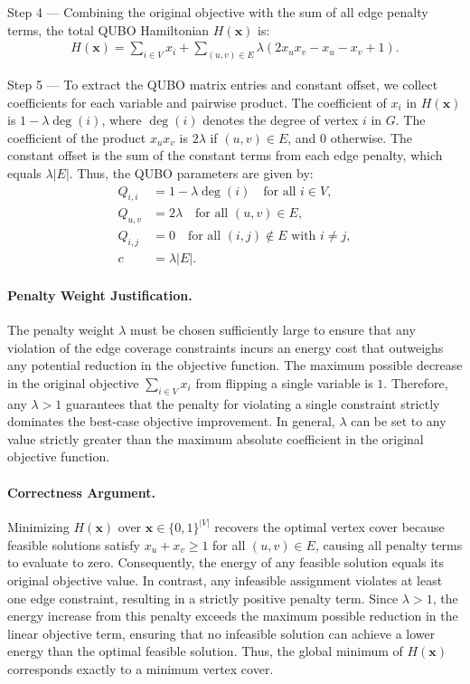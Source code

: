 \documentclass[12pt]{article}
\begin{document}
Step 4 --- Combining the original objective with the sum of all edge penalty terms, the total QUBO Hamiltonian $H(\mathbf{x})$ is:
\begin{align}
H(\mathbf{x}) = \sum_{i \in V} x_i + \sum_{(u, v) \in E} \lambda (2x_u x_v - x_u - x_v + 1).
\end{align}

Step 5 --- To extract the QUBO matrix entries and constant offset, we collect coefficients for each variable and pairwise product. The coefficient of $x_i$ in $H(\mathbf{x})$ is $1 - \lambda \deg(i)$, where $\deg(i)$ denotes the degree of vertex $i$ in $G$. The coefficient of the product $x_u x_v$ is $2\lambda$ if $(u, v) \in E$, and $0$ otherwise. The constant offset is the sum of the constant terms from each edge penalty, which equals $\lambda |E|$. Thus, the QUBO parameters are given by:
\begin{align}
Q_{i,i} &= 1 - \lambda \deg(i) \quad \text{for all } i \in V, \\
Q_{u,v} &= 2\lambda \quad \text{for all } (u, v) \in E, \\
Q_{i,j} &= 0 \quad \text{for all } (i, j) \notin E \text{ with } i \neq j, \\
c &= \lambda |E|.
\end{align}

\paragraph{Penalty Weight Justification.}
The penalty weight $\lambda$ must be chosen sufficiently large to ensure that any violation of the edge coverage constraints incurs an energy cost that outweighs any potential reduction in the objective function. The maximum possible decrease in the original objective $\sum_{i \in V} x_i$ from flipping a single variable is $1$. Therefore, any $\lambda > 1$ guarantees that the penalty for violating a single constraint strictly dominates the best-case objective improvement. In general, $\lambda$ can be set to any value strictly greater than the maximum absolute coefficient in the original objective function.

\paragraph{Correctness Argument.}
Minimizing $H(\mathbf{x})$ over $\mathbf{x} \in \{0, 1\}^{|V|}$ recovers the optimal vertex cover because feasible solutions satisfy $x_u + x_v \ge 1$ for all $(u, v) \in E$, causing all penalty terms to evaluate to zero. Consequently, the energy of any feasible solution equals its original objective value. In contrast, any infeasible assignment violates at least one edge constraint, resulting in a strictly positive penalty term. Since $\lambda > 1$, the energy increase from this penalty exceeds the maximum possible reduction in the linear objective term, ensuring that no infeasible solution can achieve a lower energy than the optimal feasible solution. Thus, the global minimum of $H(\mathbf{x})$ corresponds exactly to a minimum vertex cover.
\end{document}
